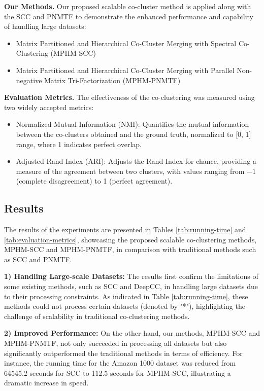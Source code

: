 \textbf{Our Methods.} Our proposed scalable co-cluster method is applied along with the SCC and PNMTF to demonstrate the enhanced performance and capability of handling large datasets:
\begin{itemize}
    \item Matrix Partitioned and Hierarchical Co-Cluster Merging with Spectral Co-Clustering (MPHM-SCC)
    \item Matrix Partitioned and Hierarchical Co-Cluster Merging with Parallel Non-negative Matrix Tri-Factorization (MPHM-PNMTF)
\end{itemize}

\textbf{Evaluation Metrics.}
The effectiveness of the co-clustering was measured using two widely accepted metrics:

\begin{itemize}
    \item Normalized Mutual Information (NMI): Quantifies the mutual information between the co-clusters obtained and the ground truth, normalized to [0, 1] range, where 1 indicates perfect overlap.
    \item Adjusted Rand Index (ARI): Adjusts the Rand Index for chance, providing a measure of the agreement between two clusters, with values ranging from $-1$ (complete disagreement) to 1 (perfect agreement).
\end{itemize}

\subsection{Results}
The results of the experiments are presented in Tables \ref{tab:running-time} and \ref{tab:evaluation-metrics}, showcasing the proposed scalable co-clustering methods, MPHM-SCC and MPHM-PNMTF, in comparison with traditional methods such as SCC and PNMTF.

\textbf{1) Handling Large-scale Datasets:} The results first confirm the limitations of some existing methods, such as SCC and DeepCC, in handling large datasets due to their processing constraints. As indicated in Table \ref{tab:running-time}, these methods could not process certain datasets (denoted by "*"), highlighting the challenge of scalability in traditional co-clustering methods.

\textbf{2) Improved Performance:} On the other hand, our methods, MPHM-SCC and MPHM-PNMTF, not only succeeded in processing all datasets but also significantly outperformed the traditional methods in terms of efficiency. For instance, the running time for the Amazon 1000 dataset was reduced from 64545.2 seconds for SCC to 112.5 seconds for MPHM-SCC, illustrating a dramatic increase in speed.

